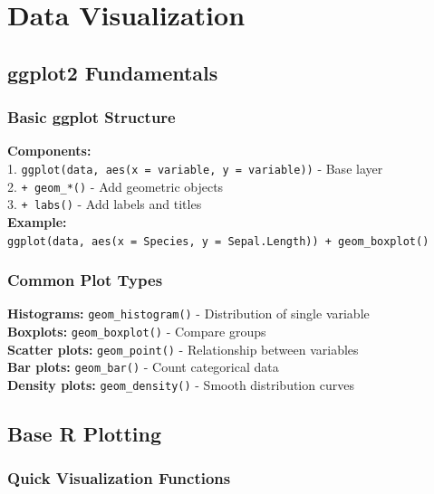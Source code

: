 \documentclass[11pt,a4paper]{article}
\begin{document}
\section{Data Visualization}

\subsection{ggplot2 Fundamentals}

\subsubsection{Basic ggplot Structure}

\begin{formulabox}
\textbf{Components:}\\
1. \texttt{ggplot(data, aes(x = variable, y = variable))} - Base layer\\
2. \texttt{+ geom\_*()} - Add geometric objects\\
3. \texttt{+ labs()} - Add labels and titles\\[0.3cm]
\textbf{Example:}\\
\texttt{ggplot(data, aes(x = Species, y = Sepal.Length)) + geom\_boxplot()}
\end{formulabox}

\subsubsection{Common Plot Types}

\begin{formulabox}
\textbf{Histograms:} \texttt{geom\_histogram()} - Distribution of single variable\\
\textbf{Boxplots:} \texttt{geom\_boxplot()} - Compare groups\\
\textbf{Scatter plots:} \texttt{geom\_point()} - Relationship between variables\\
\textbf{Bar plots:} \texttt{geom\_bar()} - Count categorical data\\
\textbf{Density plots:} \texttt{geom\_density()} - Smooth distribution curves
\end{formulabox}

\subsection{Base R Plotting}

\subsubsection{Quick Visualization Functions}
\end{document}
